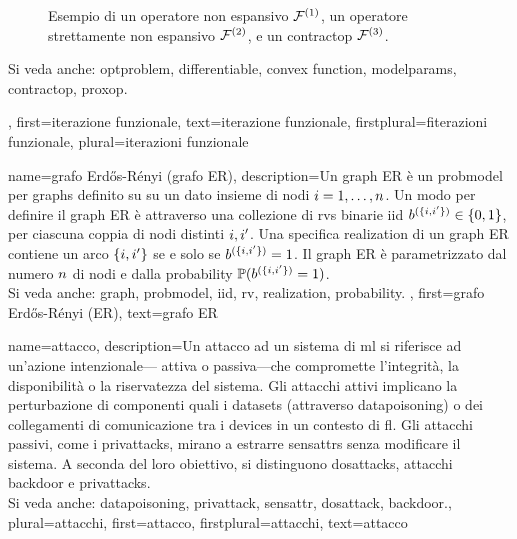 {{\begin{figure}[H]
\begin{center}
			\end{center} 
			\caption{Esempio di un operatore non espansivo $\mathcal{F}^{(1)}$, un operatore strettamente non espansivo $\mathcal{F}^{(2)}$, e 
				un \gls{contractop} $\mathcal{F}^{(3)}$. \label{fig_examples_nonexp_dict}}
		\end{figure} 
		Si veda anche: \gls{optproblem}, \gls{differentiable}, \gls{convex} \gls{function}, \gls{modelparams}, \gls{contractop}, \gls{proxop}.
	},
	first={iterazione funzionale},
	text={iterazione funzionale},
	firstplural={fiterazioni funzionale}, 
	plural={iterazioni funzionale}
}


{name={grafo Erd\H{o}s-R\'enyi (grafo ER)},
	description={Un \gls{graph} ER è un \gls{probmodel} per \glspl{graph} definito su 
		su un dato insieme di nodi $i=1,\ldots,n$. Un modo per definire il \gls{graph} ER è 
		attraverso una collezione di \glspl{rv} binarie \gls{iid} $b^{(\{i,i'\})} \in \{0,1\}$, 
		per ciascuna coppia di nodi distinti $i, i'$. Una specifica \gls{realization}  
		di un \gls{graph} ER contiene un arco $\{i,i'\}$ se e solo se 
		$b^{(\{i,i'\})}=1$. Il \gls{graph} ER è parametrizzato dal 
		numero $n$ di nodi e dalla \gls{probability} $\mathbb{P}({b^{(\{i,i'\})}=1})$. 
		\\
		Si veda anche: \gls{graph}, \gls{probmodel}, \gls{iid}, \gls{rv}, \gls{realization}, \gls{probability}.
	},
	first={grafo Erd\H{o}s-R\'enyi (ER)},
	text={grafo ER}
}

{name={attacco},  
	description={Un attacco ad un sistema di \gls{ml} si riferisce ad un'azione intenzionale— 
		attiva o passiva—che compromette l'integrità, la disponibilità o la riservatezza del sistema.
		Gli attacchi attivi implicano la perturbazione di componenti quali i \glspl{dataset} (attraverso \gls{datapoisoning}) 
		o dei collegamenti di comunicazione tra i \glspl{device} in un contesto di \gls{fl}. Gli attacchi passivi, 
		come i \glspl{privattack}, mirano a estrarre \glspl{sensattr} senza modificare il sistema. 
		A seconda del loro obiettivo, si distinguono \glspl{dosattack}, attacchi \gls{backdoor} e \glspl{privattack}.
		\\
		Si veda anche:  \gls{datapoisoning}, \gls{privattack}, \gls{sensattr}, \gls{dosattack}, \gls{backdoor}.},
	plural={attacchi}, 
	first={attacco},
	firstplural={attacchi},
	text={attacco}
}

